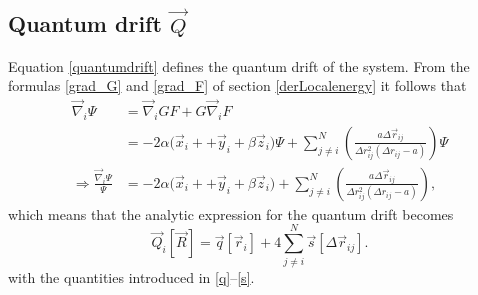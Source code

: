 \documentclass[a4paper,8pt]{article}
\begin{document}
\subsection{Quantum drift $\vec{Q}$}\label{derQuantumdrift}
Equation \eqref{quantumdrift} defines the quantum drift of the system. From the formulas \eqref{grad_G} and \eqref{grad_F} of section \ref{derLocalenergy} it follows that
\begin{align}
\vec{\nabla}_i\Psi &= \vec{\nabla}_i G F + G \vec{\nabla}_i F \nonumber\\
&= -2\alpha\Big(\vec{x}_i++\vec{y}_i+\beta\vec{z}_i\Big)\Psi + \sum\limits_{j \neq i}^N \left(\frac{a\Delta\vec{r}_{ij}}{\Delta{r}_{ij}^2(\Delta{r}_{ij}-a)}\right) \Psi \nonumber\\
\Longrightarrow \frac{\vec{\nabla}_i\Psi}{\Psi} &= -2\alpha\Big(\vec{x}_i++\vec{y}_i+\beta\vec{z}_i\Big) + \sum\limits_{j \neq i}^N \left(\frac{a\Delta\vec{r}_{ij}}{\Delta{r}_{ij}^2(\Delta{r}_{ij}-a)}\right),
\end{align}
which means that the analytic expression for the quantum drift becomes
\begin{equation}
\vec{Q}_i[\vec{R}] = \vec{q}[\vec{r}_i] + 4\sum\limits_{j \neq i}^N \vec{s}[\Delta\vec{r}_{ij}].
\end{equation}
with the quantities introduced in \eqref{q}–\eqref{s}.
\end{document}
